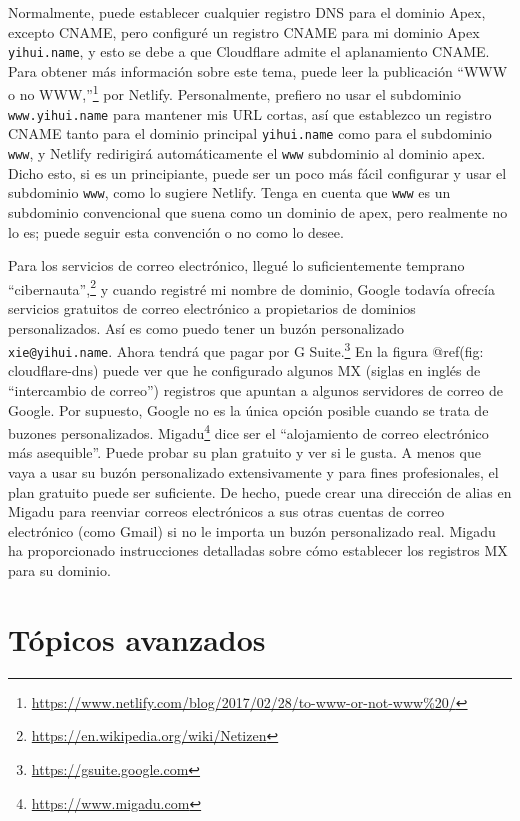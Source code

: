 \documentclass[12pt,]{krantz}
\renewcommand{\href}[2]{#2\footnote{\url{#1}}}
\theoremstyle{definition}
\theoremstyle{definition}
\theoremstyle{definition}
\theoremstyle{remark}
\begin{document}
Normalmente, puede establecer cualquier registro DNS para el dominio
Apex, excepto CNAME, pero configuré un registro CNAME para mi dominio
Apex \texttt{yihui.name}, y esto se debe a que Cloudflare admite el
aplanamiento CNAME. Para obtener más información sobre este tema, puede
leer la publicación
\href{https://www.netlify.com/blog/2017/02/28/to-www-or-not-www\%20/}{``WWW
o no WWW,''} por Netlify. Personalmente, prefiero no usar el subdominio
\texttt{www.yihui.name} para mantener mis URL cortas, así que establezco
un registro CNAME tanto para el dominio principal \texttt{yihui.name}
como para el subdominio \texttt{www}, y Netlify redirigirá
automáticamente el \texttt{www} subdominio al dominio apex. Dicho esto,
si es un principiante, puede ser un poco más fácil configurar y usar el
subdominio \texttt{www}, como lo sugiere Netlify. Tenga en cuenta que
\texttt{www} es un subdominio convencional que suena como un dominio de
apex, pero realmente no lo es; puede seguir esta convención o no como lo
desee.

Para los servicios de correo electrónico, llegué lo suficientemente
temprano \href{https://en.wikipedia.org/wiki/Netizen}{``cibernauta'',} y
cuando registré mi nombre de dominio, Google todavía ofrecía servicios
gratuitos de correo electrónico a propietarios de dominios
personalizados. Así es como puedo tener un buzón personalizado
\texttt{xie@yihui.name}. Ahora tendrá que pagar por
\href{https://gsuite.google.com}{G Suite.} En la figura @ref(fig:
cloudflare-dns) puede ver que he configurado algunos MX (siglas en
inglés de ``intercambio de correo'') registros que apuntan a algunos
servidores de correo de Google. Por supuesto, Google no es la única
opción posible cuando se trata de buzones personalizados.
\href{https://www.migadu.com}{Migadu} dice ser el ``alojamiento de
correo electrónico más asequible''. Puede probar su plan gratuito y ver
si le gusta. A menos que vaya a usar su buzón personalizado
extensivamente y para fines profesionales, el plan gratuito puede ser
suficiente. De hecho, puede crear una dirección de alias en Migadu para
reenviar correos electrónicos a sus otras cuentas de correo electrónico
(como Gmail) si no le importa un buzón personalizado real. Migadu ha
proporcionado instrucciones detalladas sobre cómo establecer los
registros MX para su dominio.

\hypertarget{topicos-avanzados}{%
\chapter{Tópicos avanzados}\label{topicos-avanzados}}
\end{document}
